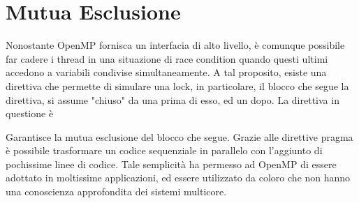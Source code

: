 \documentclass[10pt, letterpaper]{report}
\begin{document}
\section{Mutua Esclusione}
Nonostante OpenMP fornisca un interfacia di alto livello, è comunque possibile far cadere i thread in una situazione di race condition quando questi ultimi accedono a variabili condivise simultaneamente. A tal proposito, esiste una direttiva che permette di simulare una lock, in particolare, il blocco che segue la direttiva, si assume "chiuso" da una  prima di esso, ed un  dopo. La direttiva in questione è\begin{quote}
\end{quote}
Garantisce la mutua esclusione del blocco che segue.\acc 
Grazie alle direttive pragma è possibile trasformare un codice sequenziale in parallelo con l'aggiunto di pochissime linee di codice. Tale semplicità ha permesso ad OpenMP di essere adottato in moltissime applicazioni, ed essere utilizzato da coloro che non hanno una conoscienza approfondita dei sistemi multicore.
\end{document}
